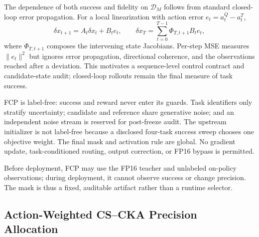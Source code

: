 The dependence of both success and fidelity on $\mathcal D_M$ follows from standard closed-loop error propagation. For a local linearization with action error $e_t=a_t^Q-a_t^T$,
\begin{equation}
 \delta x_{t+1}=A_t\delta x_t+B_te_t,
 \qquad
 \delta x_T=\sum_{t=0}^{T-1}\Phi_{T,t+1}B_te_t,
 \label{eq:closed_loop_propagation}
\end{equation}
where $\Phi_{T,t+1}$ composes the intervening state Jacobians. Per-step MSE measures $\lVert e_t\rVert^2$ but ignores error propagation, directional coherence, and the observations reached after a deviation. This motivates a sequence-level control contract and candidate-state audit; closed-loop rollouts remain the final measure of task success.

FCP is label-free: success and reward never enter its guards. Task identifiers only stratify uncertainty; candidate and reference share generative noise; and an independent noise stream is reserved for post-freeze audit. The upstream initializer is not label-free because a disclosed four-task success sweep chooses one objective weight. The final mask and activation rule are global. No gradient update, task-conditioned routing, output correction, or FP16 bypass is permitted.

Before deployment, FCP may use the FP16 teacher and unlabeled on-policy observations; during deployment, it cannot observe success or change precision. The mask is thus a fixed, auditable artifact rather than a runtime selector.

\subsection{Action-Weighted CS--CKA Precision Allocation}
\label{sec:cscka}

